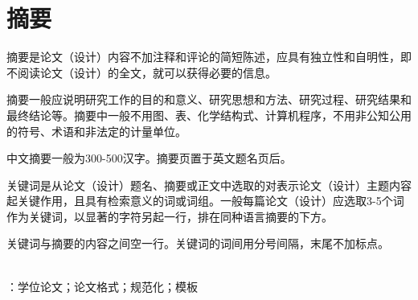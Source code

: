 

\section*{摘\quad 要}

\thesisbodyfont
摘要是论文（设计）内容不加注释和评论的简短陈述，应具有独立性和自明性，即不阅读论文（设计）的全文，就可以获得必要的信息。\par
摘要一般应说明研究工作的目的和意义、研究思想和方法、研究过程、研究结果和最终结论等。摘要中一般不用图、表、化学结构式、计算机程序，不用非公知公用的符号、术语和非法定的计量单位。\par
中文摘要一般为300-500汉字。摘要页置于英文题名页后。\par
关键词是从论文（设计）题名、摘要或正文中选取的对表示论文（设计）主题内容起关键作用，且具有检索意义的词或词组。一般每篇论文（设计）应选取3-5个词作为关键词，以显著的字符另起一行，排在同种语言摘要的下方。\par
关键词与摘要的内容之间空一行。关键词的词间用分号间隔，末尾不加标点。

~\\
：学位论文；论文格式；规范化；模板\\
